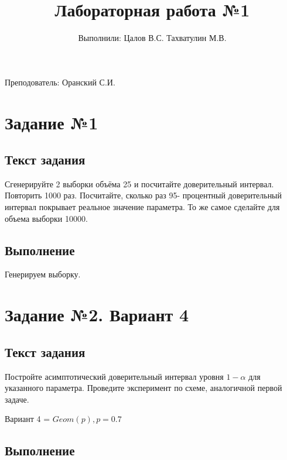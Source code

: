 \documentclass{article}
\title{Лабораторная работа №1}
\author{Выполнили: Цалов В.С. Тахватулин М.В.}
\begin{document}
\maketitle
\begin{center}
      {\fontsize{14}{15}\selectfont
            Преподователь: Оранский С.И.
      }
\end{center}


\section{Задание №1}\label{sec:-no1}
\subsection{Текст задания}
Сгенерируйте 2 выборки объёма 25 и посчитайте доверительный интервал. Повторить 1000 раз. Посчитайте, сколько раз 95-
процентный доверительный интервал покрывает реальное значение параметра. То же самое
сделайте для объема выборки 10000.

\subsection{Выполнение}
Генерируем выборку. 

\section{Задание №2. Вариант 4}
\subsection{Текст задания}
Постройте асимптотический доверительный интервал уровня $1 - \alpha$ для указанного параметра. Проведите эксперимент по схеме, аналогичной первой задаче.

Вариант 4 = $Geom(p), p = 0.7$
\subsection{Выполнение}
\end{document}
